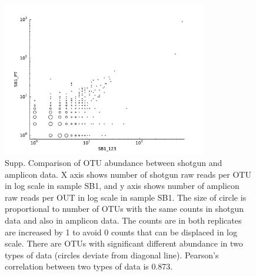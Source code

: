 \documentclass[12pt]{article}
\begin{document}
\begin{figure}[tbph!]
  \centering
  \includegraphics[width=0.8\textwidth]{figs/SB1_SGvsPT_OTUscat}

  \caption[Comparison of OTU abundance between shotgun and amplicon
  data in sample SB1]{Supp. Comparison of OTU abundance between
  shotgun and amplicon data. X axis shows number of shotgun raw reads
  per OTU in log scale in sample SB1, and y axis shows number of
  amplicon raw reads per OUT in log scale in sample SB1. The size of
  circle is proportional to number of OTUs with the same counts in
  shotgun data and also in amplicon data. The counts are in both
  replicates are increased by 1 to avoid 0 counts that can be
  displaced in log scale. There are OTUs with significant different
  abundance in two types of data (circles deviate from diagonal
  line). Pearson’s correlation between two types of data is
  0.873.}  \label{fig:SB1_SGvsPT_OTUscat}
\end{figure}
\end{document}
